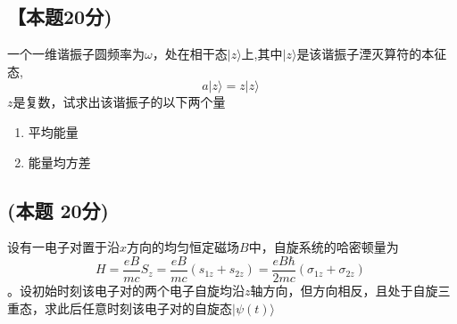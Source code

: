 \subsection{【本题20分)}
一个一维谐振子圆频率为$\omega$，处在相干态$|z\rangle$上,其中$|z\rangle$是该谐振子湮灭算符的本征态,
$$a |z\rangle = z |z\rangle~$$
$z$是复数，试求出该谐振子的以下两个量
\begin{enumerate}
\item 平均能量
\item 能量均方差
\end{enumerate}
\subsection{(本题 20分)}
设有一电子对置于沿$x$方向的均匀恒定磁场$B$中，自旋系统的哈密顿量为
$$H = \frac{eB}{mc} S_z = \frac{eB}{mc} \left( s_{1z} + s_{2z} \right) = \frac{eB\hbar}{2mc} \left( \sigma_{1z} + \sigma_{2z} \right)~$$。设初始时刻该电子对的两个电子自旋均沿$z$轴方向，但方向相反，且处于自旋三重态，求此后任意时刻该电子对的自旋态$|\psi(t)\rangle$